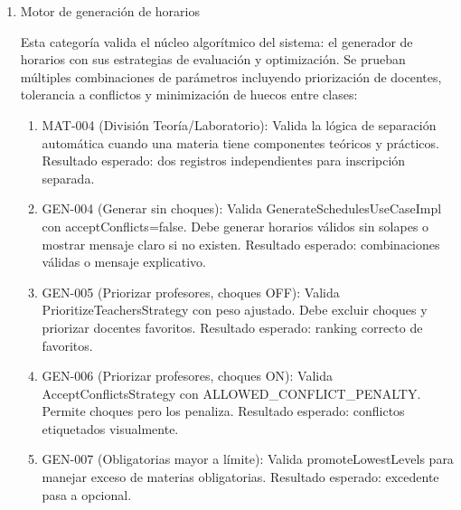 \begin{enumerate}
  Para resolver el problema de navegación (NAV-002), se refactoriza el servicio CalendarNavigationService implementando la función getDayAndWeekForInfinitePage. Esta función calcula la página correspondiente a cada día utilizando división modular (Math.floorDiv y Math.floorMod), donde cada deslizamiento horizontal representa exactamente un día visible en una secuencia infinita.
  
  El sistema utiliza una página base central (1000) como punto de referencia, permitiendo navegación tanto hacia el pasado como hacia el futuro sin límites artificiales. Esta arquitectura garantiza una experiencia fluida independientemente de la cantidad de semanas que el usuario navegue.
  
  \item Motor de generación de horarios
  
  Esta categoría valida el núcleo algorítmico del sistema: el generador de horarios con sus estrategias de evaluación y optimización. Se prueban múltiples combinaciones de parámetros incluyendo priorización de docentes, tolerancia a conflictos y minimización de huecos entre clases:
  
  \begin{enumerate}[label=\alph*)]
    \item MAT-004 (División Teoría/Laboratorio): Valida la lógica de separación automática cuando una materia tiene componentes teóricos y prácticos. Resultado esperado: dos registros independientes para inscripción separada.
    
    \item GEN-004 (Generar sin choques): Valida GenerateSchedulesUseCaseImpl con acceptConflicts=false. Debe generar horarios válidos sin solapes o mostrar mensaje claro si no existen. Resultado esperado: combinaciones válidas o mensaje explicativo.
    
    \item GEN-005 (Priorizar profesores, choques OFF): Valida PrioritizeTeachersStrategy con peso ajustado. Debe excluir choques y priorizar docentes favoritos. Resultado esperado: ranking correcto de favoritos.
    
    \item GEN-006 (Priorizar profesores, choques ON): Valida AcceptConflictsStrategy con ALLOWED\_CONFLICT\_PENALTY. Permite choques pero los penaliza. Resultado esperado: conflictos etiquetados visualmente.
    
    \item GEN-007 (Obligatorias mayor a límite): Valida promoteLowestLevels para manejar exceso de materias obligatorias. Resultado esperado: excedente pasa a opcional.
    

\end{enumerate}
\end{enumerate}
